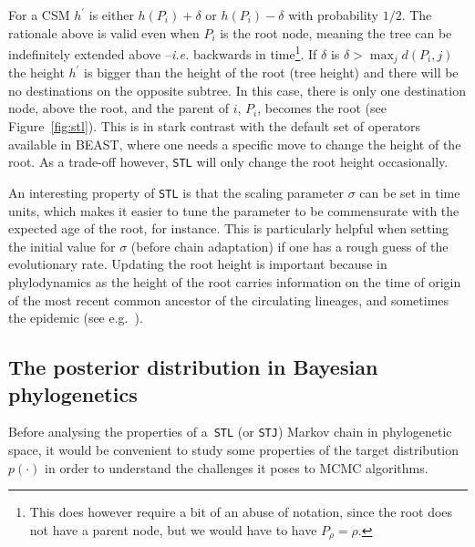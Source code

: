 For a CSM $h^\prime$ is either $h(P_i) + \delta$ or $h(P_i) - \delta$  with probability $1/2$.
The rationale above is valid even when $P_i$ is the root node, meaning the tree can be indefinitely extended above --\textit{i.e.} backwards in time\footnote{This does however require a bit of an abuse of notation, since the root does not have a parent node, but we would have to have $P_\rho = \rho$.}.
If $\delta$ is $\delta > \max_{j} d(P_i, j)$ the height $h^\prime$ is bigger than the height of the root (tree height) and there will be no destinations on the opposite subtree.
In this case, there is only one destination node, above the root, and the parent of $i$, $P_i$, becomes the root (see Figure~\ref{fig:stl}).
This is in stark contrast with the default set of operators available in BEAST, where one needs a specific move to change the height of the root.
As a trade-off however, \verb|STL| will only change the root height occasionally.

An interesting property of \verb|STL| is that the scaling parameter $\sigma$ can be set in time units, which makes it easier to tune the parameter to be commensurate with the expected age of the root, for instance.
This is particularly helpful when setting the initial value for $\sigma$ (before chain adaptation) if one has a rough guess of the evolutionary rate.
Updating the root height is important because in phylodynamics as the height of the root carries information on the time of origin of the most recent common ancestor of the circulating lineages, and sometimes the epidemic (see e.g.~\cite{Gire2014}).

\subsection{The posterior distribution in Bayesian phylogenetics}
\label{sec:prior_maths}

Before analysing the properties of a~\verb|STL| (or \verb|STJ|) Markov chain in phylogenetic space, it would be convenient to study some properties of the target distribution $p(\cdot)$ in order to understand the challenges it poses to MCMC algorithms.


